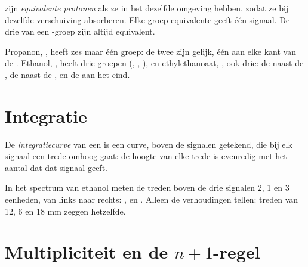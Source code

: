 \begin{definition}\label{def:g12:proton-nmr:equivalent}
 zijn \emph{equivalente protonen} als
ze in het  dezelfde omgeving hebben, zodat ze bij dezelfde
verschuiving absorberen. Elke groep equivalente  geeft één
signaal. De drie  van een -groep zijn altijd equivalent.
\end{definition}

\begin{example}\label{ex:g12:proton-nmr:groups}
Propanon, , heeft zes  maar één groep: de twee
 zijn gelijk, één aan elke kant van de . Ethanol,
, heeft drie groepen (, , ), en
ethylethanoaat, , ook drie: de  naast de
, de  naast de , en de  aan het
eind.
\end{example}

\section{Integratie}

\begin{definition}[Integratiecurve]\label{def:g12:proton-nmr:integration}
De \emph{integratiecurve} van een  is
een curve, boven de signalen getekend, die bij elk signaal een trede
omhoog gaat: de hoogte van elke trede is evenredig met het aantal
 dat dat signaal geeft.
\end{definition}

\begin{example}\label{ex:g12:proton-nmr:steps}
In het spectrum van ethanol meten de treden boven de drie signalen 2,
1 en 3 eenheden, van links naar rechts: ,  en .
Alleen de verhoudingen tellen: treden van 12, 6 en 18 mm zeggen hetzelfde.
\end{example}

\section{Multipliciteit en de \texorpdfstring{$n+1$}{n+1}-regel}


